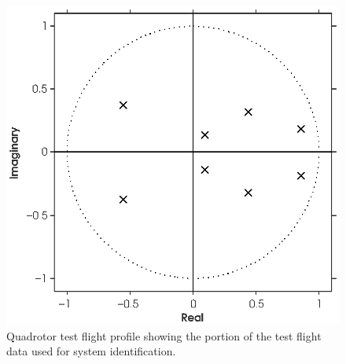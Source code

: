 \begin{figure}[htb!]
	\centering
	\includegraphics{../fig/poles_parsim.eps}
	\caption{Quadrotor test flight profile showing the portion of the test flight data used for system identification.}
\end{figure}


